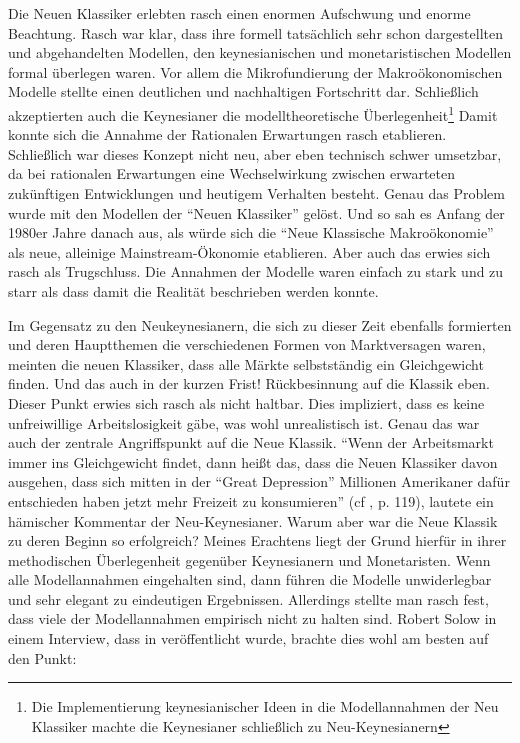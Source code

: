Die Neuen Klassiker erlebten rasch einen enormen Aufschwung und enorme Beachtung. Rasch war klar, dass ihre formell tatsächlich sehr schon dargestellten und abgehandelten Modellen, den keynesianischen und monetaristischen Modellen formal überlegen waren.
Vor allem die Mikrofundierung der Makroökonomischen Modelle stellte einen deutlichen und nachhaltigen Fortschritt dar. Schließlich akzeptierten auch die Keynesianer die modelltheoretische Überlegenheit\footnote{Die Implementierung keynesianischer Ideen in die Modellannahmen der Neu Klassiker machte die Keynesianer schließlich zu Neu-Keynesianern}
Damit konnte sich die Annahme der Rationalen Erwartungen rasch etablieren. Schließlich war dieses Konzept nicht neu, aber eben technisch schwer umsetzbar, da bei rationalen Erwartungen eine Wechselwirkung zwischen erwarteten zukünftigen Entwicklungen und heutigem Verhalten besteht. Genau das Problem wurde mit den Modellen der "`Neuen Klassiker"' gelöst. Und so sah es Anfang der 1980er Jahre danach aus, als würde sich die "`Neue Klassische Makroökonomie"' als neue, alleinige Mainstream-Ökonomie etablieren. Aber auch das erwies sich rasch als Trugschluss. Die Annahmen der Modelle waren einfach zu stark und zu starr als dass damit die Realität beschrieben werden konnte. 
		
Im Gegensatz zu den Neukeynesianern, die sich zu dieser Zeit ebenfalls formierten und deren Hauptthemen die verschiedenen Formen von Marktversagen waren, meinten die neuen Klassiker, dass alle Märkte selbstständig ein Gleichgewicht finden. Und das auch in der kurzen Frist! Rückbesinnung auf die Klassik eben. Dieser Punkt erwies sich rasch als nicht haltbar. Dies impliziert, dass es keine unfreiwillige Arbeitslosigkeit gäbe, was wohl unrealistisch ist. Genau das war auch der zentrale Angriffspunkt auf die Neue Klassik. "`Wenn der Arbeitsmarkt immer ins Gleichgewicht findet, dann heißt das, dass die Neuen Klassiker davon ausgehen, dass sich mitten in der "`Great Depression"' Millionen Amerikaner dafür entschieden haben jetzt mehr Freizeit zu konsumieren"' (cf \cite{Stiglitz1987}, p. 119), lautete ein hämischer Kommentar der Neu-Keynesianer. 
Warum aber war die Neue Klassik zu deren Beginn so erfolgreich? Meines Erachtens liegt der Grund hierfür in ihrer methodischen Überlegenheit gegenüber Keynesianern und Monetaristen. Wenn alle Modellannahmen eingehalten sind, dann führen die Modelle unwiderlegbar und sehr elegant zu eindeutigen Ergebnissen. Allerdings stellte man rasch fest, dass viele der Modellannahmen empirisch nicht zu halten sind. Robert Solow in einem Interview, dass in \textcite[S. 146]{Klamer1984} veröffentlicht wurde, brachte dies wohl am besten auf den Punkt:


